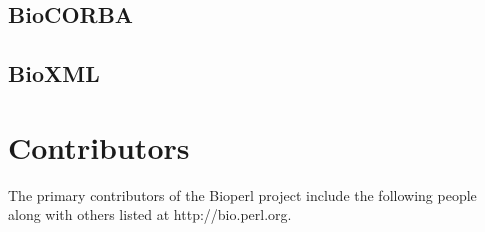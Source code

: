 \documentclass{article}
\begin{document}
\begin{twocolumn}
\subsection{BioCORBA}

\subsection{BioXML}

\section{Contributors}

The primary contributors of the Bioperl project include the following
people along with others listed at http://bio.perl.org.


\end{twocolumn}
\end{document}
